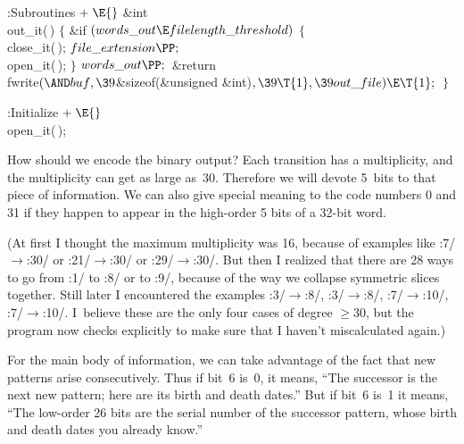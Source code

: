 \B{}:Subroutines\X${}\mathrel+\E{}$\6
\&{int} \\{out\_it}(\,)\1\1\2\2\6
${}\{{}$\1\6
\&{if} ${}(\\{words\_out}\E\\{filelength\_threshold}){}$\5
${}\{{}$\1\6
\\{close\_it}(\,);\6
${}\\{file\_extension}\PP;{}$\6
\\{open\_it}(\,);\6
\4${}\}{}$\2\6
${}\\{words\_out}\PP;{}$\6
\&{return} \\{fwrite}${}({\AND}\\{buf},\39{}$\&{sizeof}(\&{unsigned} %
\&{int})${},\39\T{1},\39\\{out\_file})\E\T{1};{}$\6
\4${}\}{}$\2\par
\fi

\B{}:Initialize\X${}\mathrel+\E{}$\6
\\{open\_it}(\,);\par
\fi

How should we encode the binary output? Each transition
has a multiplicity,
and the multiplicity can get as large as~30.
Therefore we will devote 5~bits to that piece of information.
We can also give special meaning to the code numbers 0 and 31
if they happen to appear in the high-order 5 bits of a 32-bit word.

(At first I thought the maximum multiplicity was 16, because of examples like
:7/${}\to{}$:30/ or
:21/${}\to{}$:30/ or
:29/${}\to{}$:30/.
But then I realized that there are 28 ways
to go from :1/ to :8/ or to :9/,
because of the way we collapse symmetric slices together.
Still later I encountered the examples
:3/${}\to{}$:8/,
:3/${}\to{}$:8/,
:7/${}\to{}$:10/,
:7/${}\to{}$:10/.
I~believe these are the only four cases of degree $\ge30$, but the
program now checks explicitly to make sure that I haven't miscalculated again.)

For the main body of information, we can take advantage of the fact that
new patterns arise consecutively. Thus if bit~6 is~0, it means,
``The successor is the next new pattern; here are its birth and death dates.''
But if bit~6 is~1 it means, ``The low-order 26 bits are the serial number of
the successor pattern, whose birth and death dates you already know.''

